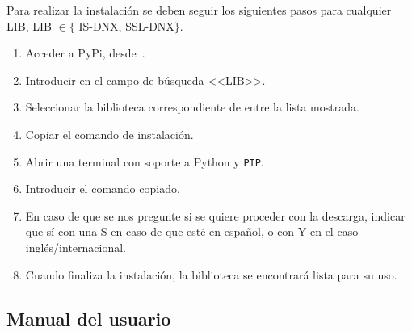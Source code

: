 Para realizar la instalación se deben seguir los siguientes pasos para cualquier LIB, LIB $\in \lbrace$ IS-DNX, SSL-DNX$\rbrace$.

\begin{enumerate}
\item Acceder a PyPi, desde~\cite{PyPI}.
\item Introducir en el campo de búsqueda <<LIB>>.
\item Seleccionar la biblioteca correspondiente de entre la lista mostrada.
\item Copiar el comando de instalación.
\item Abrir una terminal con soporte a Python y \texttt{PIP}.
\item Introducir el comando copiado.
\item En caso de que se nos pregunte si se quiere proceder con la descarga, indicar que sí con una S en caso de que esté en español, o con Y en el caso inglés/internacional.
\item Cuando finaliza la instalación, la biblioteca se encontrará lista para su uso.
\end{enumerate}



\subsection{Manual del usuario}


